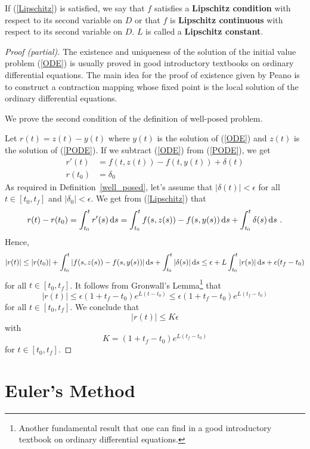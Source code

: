 \begin{rmk}
If (\ref{Lipschitz}) is satisfied, we say that $f$ satisfies a
{\bfseries Lipschitz condition} with
respect to its second variable on $D$ or that $f$ is
{\bfseries Lipschitz continuous} with
respect to its second variable on $D$.  $L$ is called a
{\bfseries Lipschitz constant}.
\end{rmk}

\begin{proof}[Proof (partial)]
The existence and uniqueness of the solution of the initial value
problem (\ref{ODE}) is usually proved in good introductory textbooks
on ordinary differential equations.  The main idea for the proof of
existence given by Peano is to construct a contraction mapping whose
fixed point is the local solution of the ordinary differential
equations.

We prove the second condition of the definition of well-posed
problem.

Let $r(t) = z(t)-y(t)$ where $y(t)$ is the solution of
(\ref{ODE}) and $z(t)$ is the solution of (\ref{PODE}).  If we
subtract (\ref{ODE}) from (\ref{PODE}), we get
\begin{align*}
r'(t) &= f(t,z(t)) - f(t,y(t)) + \delta(t)\\
r(t_0) &= \delta_0
\end{align*}
As required in Definition~\ref{well_posed}, let's assume that
$|\delta(t)| < \epsilon$ for all $t \in [t_0,t_f]$ and
$|\delta_0| < \epsilon$.  We get from (\ref{Lipschitz}) that
\[
r(t) - r(t_0) = \int_{t_0}^t r'(s) \,\mathrm{d}s 
= \int_{t_0}^t f(s,z(s)) - f(s,y(s)) \,\mathrm{d}s
+ \int_{t_0}^t \delta(s) \,\mathrm{d}s \ .
\]
Hence,
\[
|r(t)| \leq |r(t_0)| + \int_{t_0}^t |f(s,z(s)) - f(s,y(s))| \,\mathrm{d}s
+ \int_{t_0}^t |\delta(s)| \,\mathrm{d}s
\leq \epsilon + L \int_{t_0}^t |r(s)| \,\mathrm{d}s + \epsilon (t_f - t_0)
\]
for all $t \in [t_0,t_f]$.  It follows from Gronwall's
Lemma\footnote{Another fundamental result that one can find in a good
introductory textbook on ordinary differential equations.} that
\[
  |r(t)| \leq \epsilon ( 1 + t_f - t_0) e^{L(t-t_0)}
\leq \epsilon ( 1 + t_f - t_0) e^{L(t_f-t_0)}
\]
for all $t \in [t_0,t_f]$.  We conclude that
\[
  |r(t)| \leq K \epsilon
\]
with
\[
  K = ( 1 + t_f - t_0) e^{L(t_f-t_0)}
\]
for $t \in [t_0,t_f]$.
\end{proof}

\section{Euler's Method}

